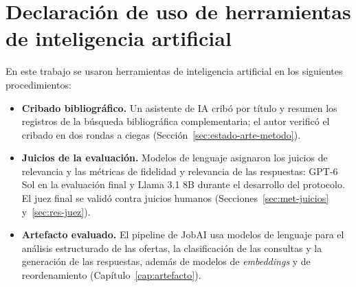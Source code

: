 \chapter*{Declaración de uso de herramientas de inteligencia artificial}

En este trabajo se usaron herramientas de inteligencia artificial en los siguientes procedimientos:
\begin{itemize}
    \item \textbf{Cribado bibliográfico.} Un asistente de IA cribó por título y resumen los registros de la búsqueda bibliográfica complementaria; el autor verificó el cribado en dos rondas a ciegas (Sección~\ref{sec:estado-arte-metodo}).
    \item \textbf{Juicios de la evaluación.} Modelos de lenguaje asignaron los juicios de relevancia y las métricas de fidelidad y relevancia de las respuestas: GPT-6 Sol en la evaluación final y Llama 3.1 8B durante el desarrollo del protocolo. El juez final se validó contra juicios humanos (Secciones~\ref{sec:met-juicios} y~\ref{sec:res-juez}).
    \item \textbf{Artefacto evaluado.} El pipeline de JobAI usa modelos de lenguaje para el análisis estructurado de las ofertas, la clasificación de las consultas y la generación de las respuestas, además de modelos de \textit{embeddings} y de reordenamiento (Capítulo~\ref{cap:artefacto}).
\end{itemize}
